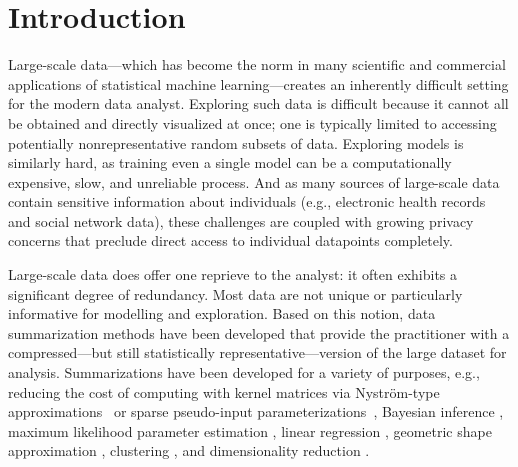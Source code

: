 \section{Introduction}
\label{sec:intro}


Large-scale data---which has become the norm in many scientific and commercial applications of statistical machine learning---creates
an inherently difficult setting for the modern data analyst. Exploring such data is difficult because it cannot all be
obtained and directly visualized at once; one is typically limited to accessing potentially nonrepresentative random subsets of data.
Exploring models is similarly hard, as training even a single model can be a computationally expensive, slow, and unreliable process.
And as many sources of large-scale data contain sensitive information about 
individuals (e.g., electronic health records and social network data),
these challenges are coupled with growing privacy concerns  that preclude direct access to individual datapoints completely. 

Large-scale data does offer one reprieve to the analyst: it often exhibits a significant degree of redundancy. Most data are 
not unique or particularly informative for modelling and exploration. Based on this notion, data summarization methods have been developed  
that provide the practitioner with a compressed---but still statistically representative---version of the large dataset for analysis.
Summarizations have been developed for a variety of purposes, e.g., reducing the cost of computing with kernel matrices via Nystr{\"o}m-type approximations~\citep{drineas05,musco17,agrawal19} or sparse pseudo-input parameterizations~\citep{snelson05},
Bayesian inference \citep{huggins16,huggins17,campbell18,campbell19jmlr,campbell19neurips}, maximum likelihood 
parameter estimation \citep{dumouchel99,madigan02}, 
linear regression \citep{zhou08,guhaniyogi15},
geometric shape approximation \citep{agarwal05},
clustering \citep{feldman11,lucic16,bachem15,braverman16}, and dimensionality reduction \citep{feldman16}.


